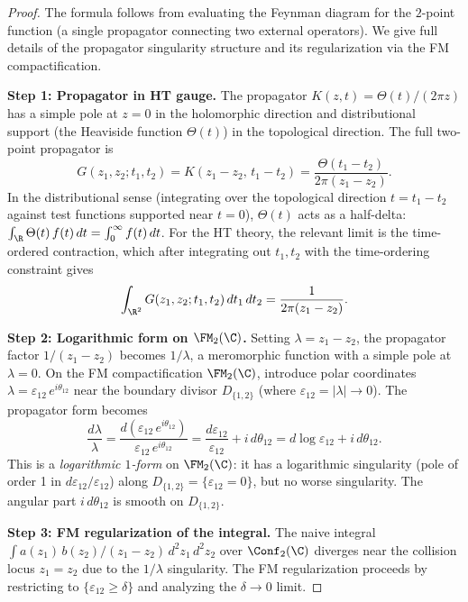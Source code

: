 \begin{proof}
The formula follows from evaluating the Feynman diagram for the $2$-point function (a single propagator connecting two external operators). We give full details of the propagator singularity structure and its regularization via the FM compactification.

\textbf{Step 1: Propagator in HT gauge.}
The propagator $K(z,t) = \Theta(t)/(2\pi z)$ has a simple pole at $z = 0$ in the holomorphic direction and distributional support (the Heaviside function $\Theta(t)$) in the topological direction. The full two-point propagator is
\[
G(z_1, z_2; t_1, t_2) = K(z_1 - z_2,\, t_1 - t_2) = \frac{\Theta(t_1 - t_2)}{2\pi(z_1 - z_2)}.
\]
In the distributional sense (integrating over the topological direction $t = t_1 - t_2$ against test functions supported near $t = 0$), $\Theta(t)$ acts as a half-delta: $\int_\R \Theta(t)\, f(t)\, dt = \int_0^\infty f(t)\, dt$. For the HT theory, the relevant limit is the time-ordered contraction, which after integrating out $t_1, t_2$ with the time-ordering constraint gives
\[
\int_{\R^2} G(z_1, z_2; t_1, t_2)\, dt_1\, dt_2 = \frac{1}{2\pi(z_1 - z_2)}.
\]

\textbf{Step 2: Logarithmic form on $\FM_2(\C)$.}
Setting $\lambda = z_1 - z_2$, the propagator factor $1/(z_1 - z_2)$ becomes $1/\lambda$, a meromorphic function with a simple pole at $\lambda = 0$. On the FM compactification $\FM_2(\C)$, introduce polar coordinates $\lambda = \varepsilon_{12}\, e^{i\theta_{12}}$ near the boundary divisor $D_{\{1,2\}}$ (where $\varepsilon_{12} = |\lambda| \to 0$). The propagator form becomes
\[
\frac{d\lambda}{\lambda} = \frac{d(\varepsilon_{12}\, e^{i\theta_{12}})}{\varepsilon_{12}\, e^{i\theta_{12}}} = \frac{d\varepsilon_{12}}{\varepsilon_{12}} + i\, d\theta_{12} = d\log\varepsilon_{12} + i\, d\theta_{12}.
\]
This is a \emph{logarithmic $1$-form} on $\FM_2(\C)$: it has a logarithmic singularity (pole of order 1 in $d\varepsilon_{12}/\varepsilon_{12}$) along $D_{\{1,2\}} = \{\varepsilon_{12} = 0\}$, but no worse singularity. The angular part $i\, d\theta_{12}$ is smooth on $D_{\{1,2\}}$.

\textbf{Step 3: FM regularization of the integral.}
The naive integral $\int a(z_1)\, b(z_2) / (z_1 - z_2)\, d^2z_1\, d^2z_2$ over $\Conf_2(\C)$ diverges near the collision locus $z_1 = z_2$ due to the $1/\lambda$ singularity. The FM regularization proceeds by restricting to $\{\varepsilon_{12} \geq \delta\}$ and analyzing the $\delta \to 0$ limit.


\end{proof}
